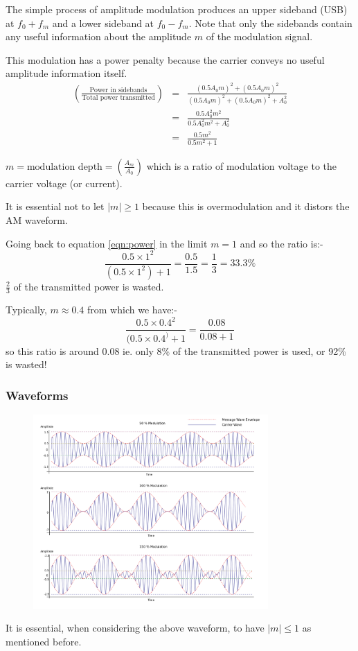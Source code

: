 \documentclass[11pt]{article} %
\begin{document}

The simple process of amplitude modulation produces an upper sideband (USB) at $f_0+f_m$ and a lower sideband at $f_0-f_m$. Note that only the sidebands contain any useful information about the amplitude $m$ of the modulation signal.

This modulation has a power penalty because the carrier conveys no useful amplitude information itself.
\begin{eqnarray}
\left(\frac{\mbox{Power in sidebands}}{\mbox{Total power transmitted}}\right) &=& \frac{(0.5A_0m)^2+(0.5A_0m)^2}{(0.5A_0m)^2+(0.5A_0m)^2+A_0^2} \nonumber \\
&=& \frac{0.5A_0^2m^2}{0.5A_0^2m^2 + A_0^2} \nonumber \\
&=& \frac{0.5m^2}{0.5m^2+1}
\label{eqn:power}
\end{eqnarray}

$m = \mbox{modulation depth} = \left(\frac{A_m}{A_0}\right)$ which is a ratio of modulation voltage to the carrier voltage (or current).

It is essential not to let $|m|\ge 1$ because this is overmodulation and it distors the AM waveform.

Going back to equation \ref{eqn:power}  in the limit $m=1$ and so the ratio is:-
\begin{equation}
\frac{0.5\times 1^2}{(0.5\times 1^2)+1} = \frac{0.5}{1.5} = \frac{1}{3} = 33.3\%
\end{equation}
$\frac{2}{3}$ of the transmitted power is wasted.

Typically, $m\approx 0.4$ from which we have:-
\begin{equation}
\frac{0.5\times 0.4^2}{(0.5\times 0.4^)+1} = \frac{0.08}{0.08+1}
\end{equation}
so this ratio is around 0.08 ie. only 8\% of the transmitted power is used, or 92\% is wasted!

\subsubsection{Waveforms}
	\begin{figure}[h]
		\centering
		\includegraphics[width=0.8\textwidth]{modulatedwave}
	\end{figure}
It is essential, when considering the above waveform, to have $|m|\le 1$ as mentioned before.
\end{document}

